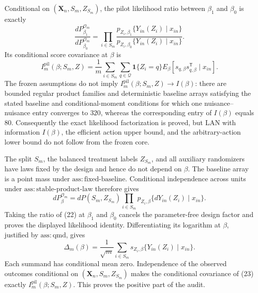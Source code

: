 Conditional on \((\mathbf X_n,S_m,Z_{S_m})\), the pilot likelihood ratio between \(\beta_1\) and \(\beta_0\) is exactly
\[
\frac{dP_{\beta_1}^{\mathcal O_m}}
     {dP_{\beta_0}^{\mathcal O_m}}
=\prod_{i\in S_m}
\frac{p_{Z_i,\beta_1}\{Y_{in}(Z_i)\mid x_{in}\}}
     {p_{Z_i,\beta_0}\{Y_{in}(Z_i)\mid x_{in}\}}.
\]
Its conditional score covariance at \(\beta\) is
\[
I_m^{\mathrm{pil}}(\beta;S_m,Z)
=\frac1m\sum_{i\in S_m}\sum_{q\in\mathcal Q}
\mathbf 1\{Z_i=q\}
E_\beta\!\left[
s_{q,\beta}s_{q,\beta}^{\mathsf T}\mid x_{in}
\right].
\]
The frozen assumptions do not imply
\(I_m^{\mathrm{pil}}(\beta;S_m,Z)\to I(\beta)\): there are bounded regular product families and deterministic baseline arrays satisfying the stated baseline and conditional-moment conditions for which one nuisance--nuisance entry converges to \(320\), whereas the corresponding entry of \(I(\beta)\) equals \(80\).  Consequently the exact likelihood factorization is proved, but LAN with information \(I(\beta)\), the efficient action upper bound, and the arbitrary-action lower bound do not follow from the frozen core.

The split \(S_m\), the balanced treatment labels \(Z_{S_m}\), and all auxiliary randomizers have laws fixed by the design and hence do not depend on \(\beta\).  The baseline array is a point mass under \(\mathrm{ass{:}fixed\text{-}baseline}\).  Conditional independence across units under \(\mathrm{ass{:}stable\text{-}product\text{-}law}\) therefore gives
\[
dP_\beta^{\mathcal O_m}
=dP(S_m,Z_{S_m})
\prod_{i\in S_m}
p_{Z_i,\beta}\{dY_{in}(Z_i)\mid x_{in}\}.
\tag{22}
\]
Taking the ratio of (22) at \(\beta_1\) and \(\beta_0\) cancels the parameter-free design factor and proves the displayed likelihood identity.  Differentiating its logarithm at \(\beta\), justified by \(\mathrm{ass{:}qmd}\), gives
\[
\Delta_m(\beta)
=\frac1{\sqrt m}\sum_{i\in S_m}
s_{Z_i,\beta}\{Y_{in}(Z_i)\mid x_{in}\}.
\tag{23}
\]
Each summand has conditional mean zero.  Independence of the observed outcomes conditional on \((\mathbf X_n,S_m,Z_{S_m})\) makes the conditional covariance of (23) exactly \(I_m^{\mathrm{pil}}(\beta;S_m,Z)\).  This proves the positive part of the audit.

